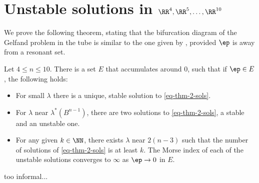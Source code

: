 \section{Unstable solutions in $\RR^4,\RR^5,\dots,\RR^{10}$}

We prove the following theorem, stating that the bifurcation diagram of the
Gelfand problem in the tube is similar to the one given by
\cite{stable-solutions-elliptic}, provided $\ep$ is away from a resonant
set.

\begin{theorem}
    Let $4\leq n \leq 10$. There is a set $E$ that accumulates around 0, such
    that if $\ep\in E$, the following holds: 
    \begin{itemize}
        \item For small $\lambda$ there is a unique, stable solution to
            \ref{eq-thm-2-sols}.
        \item For $\lambda$ near $\lambda^\ast(B^{n-1})$, there are two
            solutions to \ref{eq-thm-2-sols}, a stable and an unstable one.
        \item For any given $k\in \NN$, there exists $\lambda$ near $2(n-3)$
            such that the number of solutions of \ref{eq-thm-2-sols} is at least
            $k$. The Morse index of each of the unstable solutions converges to
            $\infty$ as $\ep\to 0$ in $E$.
    \end{itemize}
\end{theorem}

{\color{red} too informal...}
